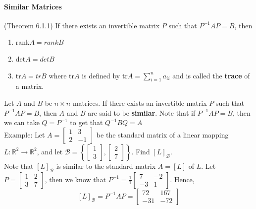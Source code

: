 \documentclass[10pt,letter]{article}
\begin{document}
\paragraph{Similar Matrices} (Theorem 6.1.1) If there exists an invertible matrix $P$ such that $P^{-1}AP=B$, then \begin{enumerate}
    \item rank$A=rankB$ 
    \item det$A=detB$ 
    \item tr$A=trB$ where tr$A$ is defined by tr$A=\sum_{i=1}^na_{ii}$ and is called the \textbf{trace} of a matrix. 
\end{enumerate}
Let $A$ and $B$  be $n\times n$ matrices. If there exists an invertible matrix $P$ such that $P^{-1}AP=B$, then $A$ and $B$ are said to be \textbf{similar}. Note that if $P^{-1}AP=B$, then we can take $Q=P^{-1}$ to get that $Q^{-1}BQ=A$\\
Example: Let $A=\begin{bmatrix}1&3\\2&-1\end{bmatrix}$ be the standard matrix of a linear mapping $L:\mathbb{R}^2\rightarrow\mathbb{R}^2$, and let $\mathcal{B}=\left\{\begin{bmatrix}1\\3\end{bmatrix},\begin{bmatrix}2\\7\end{bmatrix}\right\}$. Find $[L]_\mathcal{B}$. \\ 
Note that $[L]_\mathcal{B}$ is similar to the standard matrix $A=[L]$ of $L$. Let $P=\begin{bmatrix}1&2\\3&7\end{bmatrix}$, then we know that $P^{-1}=\frac{1}{1}\begin{bmatrix}7&-2\\-3&1\end{bmatrix}$. Hence, $$[L]_\mathcal{B}=P^{-1}AP=\begin{bmatrix}72&167\\-31&-72\end{bmatrix}$$
\end{document}
